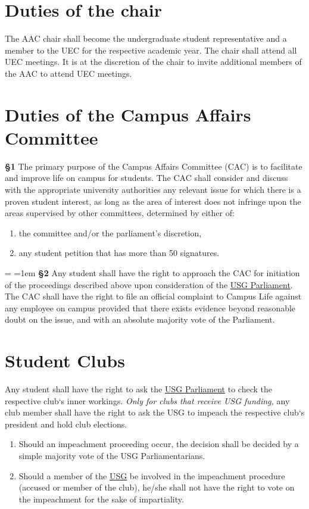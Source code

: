 \documentclass[12pt]{LaTeX_Misc/constitution}
\begin{document}
\section{Duties of the chair}
The AAC chair shall become the undergraduate student representative and a member to the UEC for the respective academic year. The chair shall attend all UEC meetings. It is at the discretion of the chair to invite additional members of the AAC to attend UEC meetings.

\label{CACByLawsdef}

\section{Duties of the Campus Affairs Committee}
\textbf{\S{}1} The primary purpose of the Campus Affairs Committee (CAC)  is to facilitate and improve life on campus for students. The CAC shall consider and discuss with the appropriate university authorities any relevant issue for which there is a proven student interest, as long as the area of interest does not infringe upon the areas supervised by other committees, determined by either of:
\begin{enumerate}
\item the committee and/or the parliament's discretion,
\item any student petition that has more than 50 signatures.
\end{enumerate}

{\parskip=\baselineskip
\parindent=1em
\textbf{\S{}2} Any student shall have the right to approach the CAC for initiation of the proceedings described above upon consideration of the \hyperref[USGParliamentDef]{USG Parliament}.
The CAC shall have the right to file an official complaint to Campus Life against any employee on campus provided that there exists evidence beyond reasonable doubt on the issue, and with an absolute majority vote of the Parliament.}


\section{Student Clubs}
Any student shall have the right to ask the \hyperref[USGParliamentDef]{USG Parliament} to check the respective club`s inner workings. \textit{Only for clubs that receive USG funding,} any club member shall have the right to ask the USG to impeach the respective club`s president and hold club elections. 
\begin{enumerate}[label={\textbf{\S\arabic*}}]
\item Should an impeachment proceeding occur, the decision shall be decided by a simple majority vote of the USG Parliamentarians.
\item Should a member of the \hyperref[USGdef]{USG} be involved in the impeachment procedure (accused or member of the club), he/she shall not have the right to vote on the impeachment for the sake of impartiality.
\end{enumerate}
\end{document}
